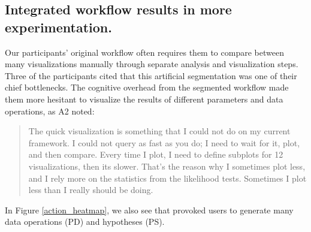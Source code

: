 \subsection{Integrated workflow results in more experimentation.}
\par Our participants' original workflow often requires them to compare between many visualizations manually through separate analysis and visualization steps.  Three of the participants cited that this artificial segmentation was one of their chief bottlenecks. The cognitive overhead from the segmented workflow made them more hesitant to visualize the results of different parameters and data operations, as A2 noted:
\begin{quote}
The quick visualization is something that I could not do on my current framework. I could not query as fast as you do; I need to wait for it, plot, and then compare. Every time I plot, I need to define subplots for 12 visualizations, then its slower. That's the reason why I sometimes plot less, and I rely more on the statistics from the likelihood tests. Sometimes I plot less than I really should be doing.
\end{quote}
In Figure \ref{action_heatmap}, we also see that \ourVQS provoked users to generate many data operations (PD) and hypotheses (PS).
